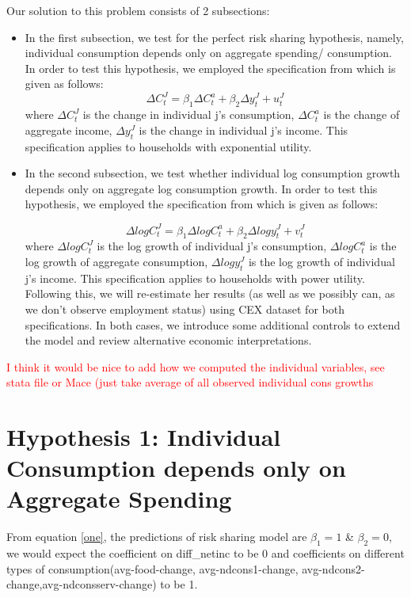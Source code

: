 \documentclass[12pt,a4paper]{article}
\begin{document}
Our solution to this problem consists of 2 subsections:
\begin{itemize}
    \item In the first subsection, we test for the perfect risk sharing hypothesis, namely, individual consumption depends only on aggregate spending/ consumption. In order to test this hypothesis, we employed the specification from \citealp{mace1991} which is given as follows:
\begin{equation}\label{one}
      \Delta C_t^J =\beta_1 \Delta C_t^a + \beta_2 \Delta y_t^J + u_t^J
\end{equation}
where $\Delta C_t^J$ is the change in individual j's consumption, $\Delta C_t^a$ is the change of aggregate income, $\Delta y_t^J$ is the change in individual j's income. This specification applies to households with exponential utility.

\item In the second subsection, we test whether individual log consumption growth depends only on aggregate log consumption growth. In order to test this hypothesis, we employed the specification from \citealp{mace1991} which is given as follows:

\begin{equation}\label{two}
      \Delta log  C_t^J =\beta_1 \Delta log C_t^a + \beta_2 \Delta log y_t^J + v_t^J
\end{equation}
where   $\Delta log  C_t^J$ is the log growth of individual j's consumption,   $  \Delta log  C_t^a$ is the log growth of aggregate consumption,  $ \Delta log y_t^J$ is the log growth of  individual j's income. This specification applies to households with power utility. \\

Following this, we will re-estimate her results (as well as we possibly can, as we don’t observe employment status) using CEX dataset for both specifications. In both cases, we introduce some additional controls to extend the model and review alternative economic interpretations.
\end{itemize}

\textcolor{red}{I think it would be nice to add how we computed the individual variables, see stata file or Mace (just take average of all observed individual cons growths}

\section*{Hypothesis 1: Individual Consumption depends only on Aggregate Spending}
From equation \eqref{one}, the predictions of risk sharing model are $\beta_1=1$ \& $\beta_2=0$, we would expect the coefficient on diff\_netinc to be 0 and coefficients on different types of consumption(avg-food-change, avg-ndcons1-change,  avg-ndcons2-change,avg-ndconsserv-change) to be 1. \\
\end{document}
